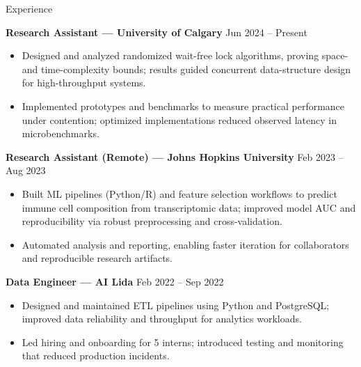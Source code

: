 \documentclass{resume}
\begin{document}
\begin{rSection}{Experience}

{\bf Research Assistant — University of Calgary} \hfill Jun 2024 -- Present \\
\begin{itemize}
  \item Designed and analyzed randomized wait-free lock algorithms, proving space- and time-complexity bounds; results guided concurrent data-structure design for high-throughput systems.
  \item Implemented prototypes and benchmarks to measure practical performance under contention; optimized implementations reduced observed latency in microbenchmarks.
\end{itemize}

{\bf Research Assistant (Remote) — Johns Hopkins University} \hfill Feb 2023 -- Aug 2023 \\
\begin{itemize}
  \item Built ML pipelines (Python/R) and feature selection workflows to predict immune cell composition from transcriptomic data; improved model AUC and reproducibility via robust preprocessing and cross-validation.
  \item Automated analysis and reporting, enabling faster iteration for collaborators and reproducible research artifacts.
\end{itemize}

{\bf Data Engineer — AI Lida} \hfill Feb 2022 -- Sep 2022 \\
\begin{itemize}
  \item Designed and maintained ETL pipelines using Python and PostgreSQL; improved data reliability and throughput for analytics workloads.
  \item Led hiring and onboarding for 5 interns; introduced testing and monitoring that reduced production incidents.
\end{itemize}

\end{rSection}
\end{document}
